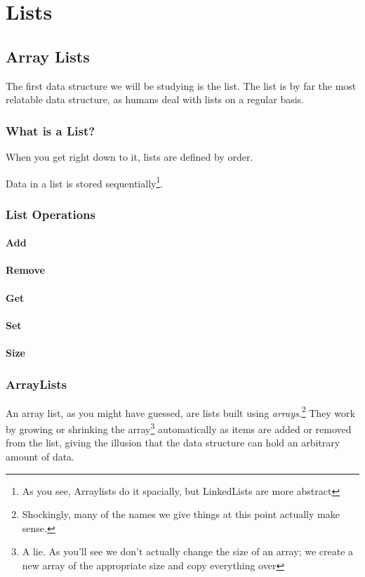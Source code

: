 
\part{Lists}

\chapter{Array Lists}
\label{chap-arraylist}

\label{arraylist}
The first data structure we will be studying is the list.
The list is by far the most relatable data structure, as humans deal with lists on a regular basis.

\section{What is a List?}


When you get right down to it, lists are defined by order.


Data in a list is stored sequentially\footnote{As you see, Arraylists do it spacially, but LinkedLists are more abstract}.

\section{List Operations}

\subsection{Add}  
\subsection{Remove}
\subsection{Get}
\subsection{Set}
\subsection{Size}


\section{ArrayLists}
An array list, as you might have guessed, are lists built using \textit{arrays}.\footnote{Shockingly, many of the names we give things at this point actually make sense.}
They work by growing or shrinking the array\footnote{A lie.  As you'll see we don't actually change the size of an array;  we create a new array of the appropriate size and copy everything over} automatically as items are added or removed from the list, giving the illusion that the data structure can hold an arbitrary amount of data.

